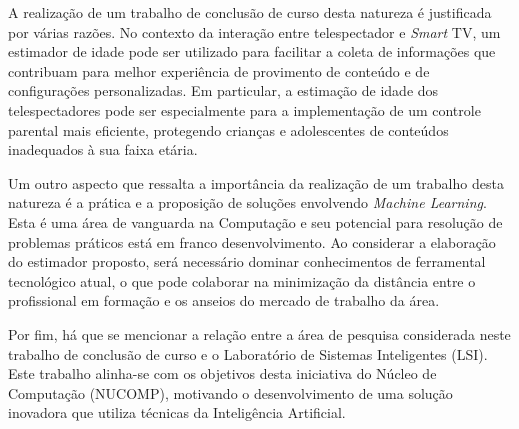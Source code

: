 A realização de um trabalho de conclusão de curso desta natureza é justificada por várias razões. No contexto da interação entre telespectador e \emph{Smart} TV, um estimador de idade pode ser utilizado para facilitar a coleta de informações que contribuam para melhor experiência de provimento de conteúdo e de configurações personalizadas. Em particular, a estimação de idade dos telespectadores pode ser especialmente para a implementação de um controle parental mais eficiente, protegendo crianças e adolescentes de conteúdos inadequados à sua faixa etária.

Um outro aspecto que ressalta a importância da realização de um trabalho desta natureza é a prática e a proposição de soluções envolvendo \emph{Machine Learning}. Esta é uma área de vanguarda na Computação e seu potencial para resolução de problemas práticos está em franco desenvolvimento. Ao considerar a elaboração do estimador proposto, será necessário dominar conhecimentos de  ferramental tecnológico atual, o que pode colaborar na minimização da distância entre o profissional em formação e os anseios do mercado de trabalho da área.

Por fim, há que se mencionar a relação entre a área de pesquisa considerada neste trabalho de conclusão de curso e o Laboratório de Sistemas Inteligentes (LSI). Este trabalho alinha-se com os objetivos desta iniciativa do Núcleo de Computação (NUCOMP), motivando o desenvolvimento de uma solução  inovadora que utiliza técnicas da Inteligência Artificial.
